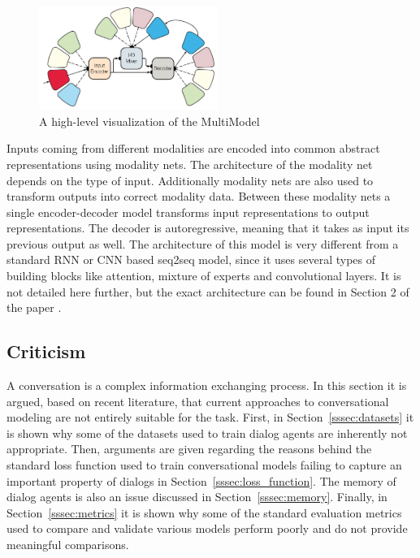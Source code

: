 \documentclass[12pt]{article}
\begin{document}
\begin{figure}[H]
	\centering
	\includegraphics[width=0.52\textwidth]{pics/multimodel.png}
	\caption{A high-level visualization of the MultiModel \cite{Kaiser_one_model:2017}}
	\label{fig:multimodel}
\end{figure}
Inputs coming from different modalities are encoded into common abstract representations using modality nets. The architecture of the modality net depends on the type of input. Additionally modality nets are also used to transform outputs into correct modality data. Between these modality nets a single encoder-decoder model transforms input representations to output representations. The decoder is autoregressive, meaning that it takes as input its previous output as well. The architecture of this model is very different from a standard RNN or CNN based seq2seq model, since it uses several types of building blocks like attention, mixture of experts and convolutional layers. It is not detailed here further, but the exact architecture can be found in Section 2 of the paper \cite{Kaiser_one_model:2017}.



\subsection{Criticism} \label{ssec:problems}
A conversation is a complex information exchanging process. In this section it is argued, based on recent literature, that current approaches to conversational modeling are not entirely suitable for the task. First, in Section~\ref{sssec:datasets} it is shown why some of the datasets used to train dialog agents are inherently not appropriate. Then, arguments are given regarding the reasons behind the standard loss function used to train conversational models failing to capture an important property of dialogs in Section~\ref{sssec:loss_function}. The memory of dialog agents is also an issue discussed in Section~\ref{sssec:memory}. Finally, in Section~\ref{sssec:metrics} it is shown why some of the standard evaluation metrics used to compare and validate various models perform poorly and do not provide meaningful comparisons.
	
\end{document}
